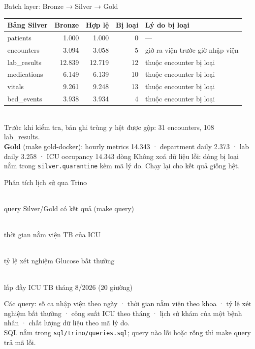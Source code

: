 \documentclass[aspectratio=169,11pt]{beamer}
\newcommand{\cmd}[1]{{\ttfamily\small\color{teal}#1}}
\newcommand{\bignum}[2]{\begin{minipage}[t]{0.23\textwidth}\centering{\Huge\bfseries\color{teal}#1}\\[2pt]{\small\color{muted}#2}\end{minipage}}
\begin{document}
\begin{frame}{Batch layer: Bronze → Silver → Gold}
  \small
  \begin{tabular}{@{}lrrrl@{}}
    \toprule
    \textbf{Bảng Silver} & \textbf{Bronze} & \textbf{Hợp lệ} & \textbf{Bị loại} & \textbf{Lý do bị loại} \\
    \midrule
    patients     & 1.000  & 1.000  & 0  & — \\
    encounters   & 3.094  & 3.058  & 5  & giờ ra viện trước giờ nhập viện \\
    lab\_results & 12.839 & 12.719 & 12 & thuộc encounter bị loại \\
    medications  & 6.149  & 6.139  & 10 & thuộc encounter bị loại \\
    vitals       & 9.261  & 9.248  & 13 & thuộc encounter bị loại \\
    bed\_events  & 3.938  & 3.934  & 4  & thuộc encounter bị loại \\
    \bottomrule
  \end{tabular}\\[4pt]
  {\footnotesize\color{muted} Trước khi kiểm tra, bản ghi trùng y hệt được gộp: 31 encounters, 108 lab\_results.}\\[10pt]
  \textbf{Gold} (\cmd{make gold-docker}): hourly metrics 14.343 · department daily 2.373 · lab daily 3.258 · ICU occupancy 14.343 dòng
  \vfill
  {\footnotesize\color{muted} Không xoá dữ liệu lỗi: dòng bị loại nằm trong \texttt{silver.quarantine} kèm mã lý do. Chạy lại cho kết quả giống hệt.}
\end{frame}

\begin{frame}{Phân tích lịch sử qua Trino}
  \begin{center}
    \bignum{11/11}{query Silver/Gold có kết quả (\cmd{make query})}\hfill
    \bignum{187 h}{thời gian nằm viện TB của ICU}\hfill
    \bignum{27,8\%}{tỷ lệ xét nghiệm Glucose bất thường}\hfill
    \bignum{38,3\%}{lấp đầy ICU TB tháng 8/2026 (20 giường)}
  \end{center}
  \vfill
  \small
  Các query: số ca nhập viện theo ngày · thời gian nằm viện theo khoa · tỷ lệ xét nghiệm bất thường · công suất ICU theo tháng · lịch sử khám của một bệnh nhân · chất lượng dữ liệu theo mã lý do.\\[4pt]
  {\footnotesize\color{muted} SQL nằm trong \texttt{sql/trino/queries.sql}; query nào lỗi hoặc rỗng thì \cmd{make query} trả mã lỗi.}
\end{frame}
\end{document}
